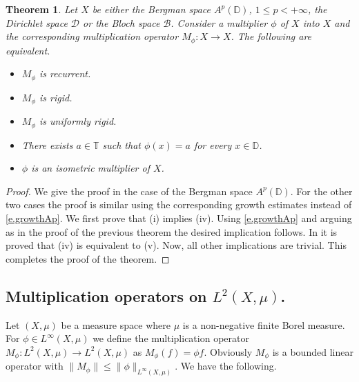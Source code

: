 \documentclass[12pt,leqno]{amsart}
\theoremstyle{plain}
\newtheorem{theorem}[equation]{Theorem}
\theoremstyle{definition}
\numberwithin{equation}{section}
\begin{document}
\begin{theorem}
	Let $X$ be either the Bergman space $A^p(\mathbb D)$, $1\leq p<+\infty$, the Dirichlet space $\mathcal D$ or the Bloch space $\mathcal B$. Consider a multiplier $\phi$ of $X$ into $X$ and the corresponding multiplication operator $M_{\phi }:X\to X$. The following are equivalent. 
	\begin{itemize}
		\item[(i)] $M_\phi $ is recurrent. 
		\item[(ii)] $M_\phi$ is rigid. 
		\item[(iii)] $M_\phi$ is uniformly rigid. 
		\item [(iv)] There exists $a\in \mathbb T$ such that $\phi (x)=a$ for every $x\in \mathbb D$. 
		\item [(v)] $\phi$ is an isometric multiplier of $X$. 
	\end{itemize}
\end{theorem}

\begin{proof}
	We give the proof in the case of the Bergman space $A^p(\mathbb D)$. For the other two cases the proof is similar using the corresponding growth estimates instead of \eqref{e.growthAp}. We first prove that (i) implies (iv). Using \eqref{e.growthAp} and arguing as in the proof of the previous theorem the desired implication follows. In \cite{ADMV} it is proved that (iv) is equivalent to (v). Now, all other implications are trivial. This completes the proof of the theorem. 
\end{proof}

\subsection{Multiplication operators on \texorpdfstring{$L^2(X,\mu)$}{L2(X,mu)}.}

Let $(X,\mu)$ be a measure space where $\mu$ is a non-negative finite Borel measure. For $\phi\in L^\infty(X,\mu)$ we define the multiplication operator $M_\phi:L^2(X,\mu)\to L^2(X,\mu)$ as $M_\phi(f)=\phi f$. Obviously $M_\phi$ is a bounded linear operator with $\|M_\phi\|\leq \|\phi\|_{L^\infty(X,\mu)}$. We have the following.
\end{document}
